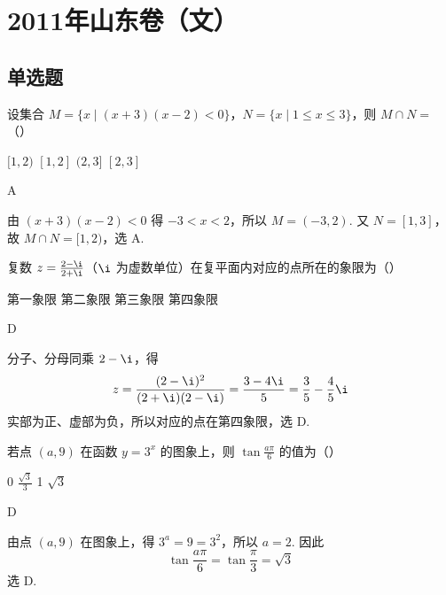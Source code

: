 \chapter{2011年山东卷（文）}

\section{单选题}

\begin{problem}
设集合 \(M = \{x \mid (x + 3)(x - 2) < 0\}\)，\(N = \{x \mid 1 \leqslant x \leqslant 3\}\)，则 \(M \cap N =\)（\quad）

\choices
    {\([1,2)\)}
    {\([1,2]\)}
    {\((2,3]\)}
    {\([2,3]\)}
\end{problem}

\begin{answer}
A
\end{answer}

\begin{solution}
由 \((x+3)(x-2)<0\) 得 \(-3<x<2\)，所以 \(M=(-3,2)\). 又 \(N=[1,3]\)，故 \(M\cap N=[1,2)\)，选 A.
\end{solution}

\begin{problem}
复数 \(z = \frac{2 - \i}{2 + \i}\)（\(\i\) 为虚数单位）在复平面内对应的点所在的象限为（\quad）

\choices
    {第一象限}
    {第二象限}
    {第三象限}
    {第四象限}
\end{problem}

\begin{answer}
D
\end{answer}

\begin{solution}
分子、分母同乘 \(2-\i\)，得
\[
z=\frac{(2-\i)^2}{(2+\i)(2-\i)}=\frac{3-4\i}{5}=\frac35-\frac45\i
\]
实部为正、虚部为负，所以对应的点在第四象限，选 D.
\end{solution}

\begin{problem}
若点 \((a,9)\) 在函数 \(y = 3^{x}\) 的图象上，则 \(\tan \frac{a\pi}{6}\) 的值为（\quad）

\choices
    {0}
    {\(\frac{\sqrt{3}}{3}\)}
    {1}
    {\(\sqrt{3}\)}
\end{problem}

\begin{answer}
D
\end{answer}

\begin{solution}
由点 \((a,9)\) 在图象上，得 \(3^a=9=3^2\)，所以 \(a=2\). 因此
\[
\tan\frac{a\pi}{6}=\tan\frac{\pi}{3}=\sqrt{3}
\]
选 D.
\end{solution}


